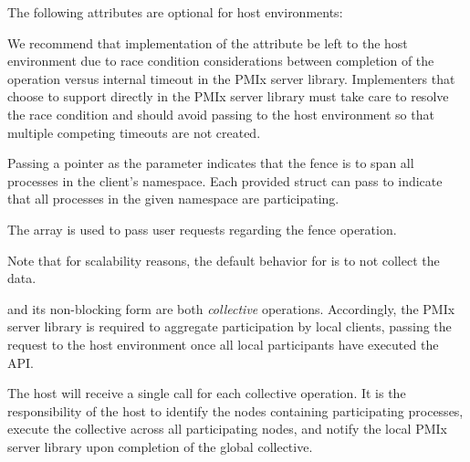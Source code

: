 
\reqattrend

\optattrstart
The following attributes are optional for host environments:


\optattrend

\adviceimplstart
We recommend that implementation of the  attribute be left to the host environment due to race condition considerations between completion of the operation versus internal timeout in the \ac{PMIx} server library. Implementers that choose to support  directly in the \ac{PMIx} server library must take care to resolve the race condition and should avoid passing  to the host environment so that multiple competing timeouts are not created.
\adviceimplend

\descr

Passing a  pointer as the  parameter indicates that the fence is to span all processes in the client's namespace.
Each provided  struct can pass  to indicate that all processes in the given namespace are participating.

The  array is used to pass user requests regarding the fence operation.

Note that for scalability reasons, the default behavior for  is to not collect the data.

\adviceimplstart
{} and its non-blocking form are both \emph{collective} operations. Accordingly, the \ac{PMIx} server library is required to aggregate participation by local clients, passing the request to the host environment once all local participants have executed the \ac{API}.
\adviceimplend

\advicermstart
The host will receive a single call for each collective operation. It is the responsibility of the host to identify the nodes containing participating processes, execute the collective across all participating nodes, and notify the local \ac{PMIx} server library upon completion of the global collective.
\advicermend

\subsection{}

